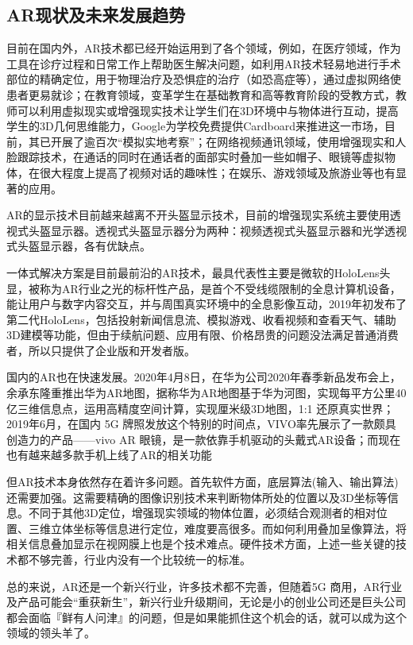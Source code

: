 \documentclass{article}
\begin{document}
\subsection{AR现状及未来发展趋势}
目前在国内外，AR技术都已经开始运用到了各个领域，例如，在医疗领域，作为工具在诊疗过程和日常工作上帮助医生解决问题，如利用AR技术轻易地进行手术部位的精确定位，用于物理治疗及恐惧症的治疗（如恐高症等），通过虚拟网络使患者更易就诊\citep{ogawa}；在教育领域，变革学生在基础教育和高等教育阶段的受教方式，教师可以利用虚拟现实或增强现实技术让学生们在3D环境中与物体进行互动，提高学生的3D几何思维能力\citep{emin}，Google为学校免费提供Cardboard来推进这一市场，目前，其已开展了逾百次“模拟实地考察”；在网络视频通讯领域，使用增强现实和人脸跟踪技术，在通话的同时在通话者的面部实时叠加一些如帽子、眼镜等虚拟物体，在很大程度上提高了视频对话的趣味性；在娱乐、游戏领域及旅游业等也有显著的应用。\par
AR的显示技术目前越来越离不开头盔显示技术，目前的增强现实系统主要使用透视式头盔显示器。透视式头盔显示器分为两种：视频透视式头盔显示器和光学透视式头盔显示器\citep{chenjing}，各有优缺点。\par
一体式解决方案是目前最前沿的AR技术，最具代表性主要是微软的HoloLens头显，被称为AR行业之光的标杆性产品，是首个不受线缆限制的全息计算机设备，能让用户与数字内容交互，并与周围真实环境中的全息影像互动，2019年初发布了第二代HoloLens，包括投射新闻信息流、模拟游戏、收看视频和查看天气、辅助3D建模等功能，但由于续航问题、应用有限、价格昂贵的问题没法满足普通消费者，所以只提供了企业版和开发者版。\par
国内的AR也在快速发展。2020年4月8日，在华为公司2020年春季新品发布会上，余承东隆重推出华为AR地图，据称华为AR地图基于华为河图，实现每平方公里40亿三维信息点，运用高精度空间计算，实现厘米级3D地图，1:1 还原真实世界；2019年6月，在国内 5G 牌照发放这个特别的时间点，VIVO率先展示了一款颇具创造力的产品——vivo AR 眼镜，是一款依靠手机驱动的头戴式AR设备；而现在也有越来越多款手机上线了AR的相关功能\par
但AR技术本身依然存在着许多问题。首先软件方面，底层算法(输入、输出算法)还需要加强。这需要精确的图像识别技术来判断物体所处的位置以及3D坐标等信息。不同于其他3D定位，增强现实领域的物体位置，必须结合观测者的相对位置、三维立体坐标等信息进行定位，难度要高很多。而如何利用叠加呈像算法，将相关信息叠加显示在视网膜上也是个技术难点。硬件技术方面，上述一些关键的技术都不够完善，行业内没有一个比较统一的标准。\par
总的来说，AR还是一个新兴行业，许多技术都不完善，但随着5G 商用，AR行业及产品可能会“重获新生”，新兴行业升级期间，无论是小的创业公司还是巨头公司都会面临『鲜有人问津』的问题，但是如果能抓住这个机会的话，就可以成为这个领域的领头羊了。\par
\end{document}
